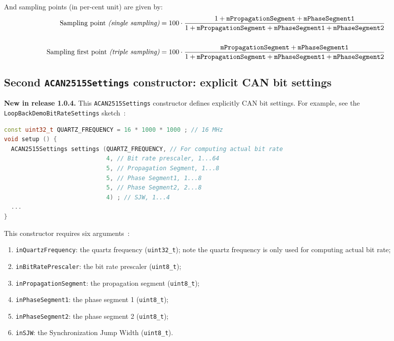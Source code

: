\documentclass[9pt, a4paper, obeyspaces]{extarticle}
\newcommand \subsectionLabel[2]{\subsection{#1}\label{subsec:#2}}
\begin{document}
And sampling points (in per-cent unit) are given by:
{\small
\begin{align*}
\text{Sampling point {\it(single sampling)}} & = 100 \cdot \frac{1 + \texttt{mPropagationSegment} + \texttt{mPhaseSegment1}}{1 + \texttt{mPropagationSegment} + \texttt{mPhaseSegment1} + \texttt{mPhaseSegment2}}  \\
  & \\
\text{Sampling first point {\it(triple sampling)}} & = 100 \cdot \frac{\texttt{mPropagationSegment} + \texttt{mPhaseSegment1}}{1 + \texttt{mPropagationSegment} + \texttt{mPhaseSegment1} + \texttt{mPhaseSegment2}}
\end{align*}
}




\subsectionLabel{Second \texttt{ACAN2515Settings} constructor: explicit CAN bit settings}{explicitCANbitSettings}

{\bf New in release 1.0.4.} This \texttt{ACAN2515Settings} constructor defines explicitly CAN bit settings. For example, see the \texttt{LoopBackDemoBitRateSettings} sketch~:
{ \small\begin{lstlisting}[language=c++]
const uint32_t QUARTZ_FREQUENCY = 16 * 1000 * 1000 ; // 16 MHz
void setup () {
  ACAN2515Settings settings (QUARTZ_FREQUENCY, // For computing actual bit rate
                             4, // Bit rate prescaler, 1...64
                             5, // Propagation Segment, 1...8
                             5, // Phase Segment1, 1...8
                             5, // Phase Segment2, 2...8
                             4) ; // SJW, 1...4
  ...
}
\end{lstlisting}}

This constructor requires six arguments~:
\begin{enumerate}
  \item \texttt{inQuartzFrequency}: the quartz frequency (\texttt{uint32\_t}); note the quartz frequency is only used for computing actual bit rate;
  \item \texttt{inBitRatePrescaler}: the bit rate prescaler (\texttt{uint8\_t});
  \item \texttt{inPropagationSegment}: the propagation segment (\texttt{uint8\_t});
  \item \texttt{inPhaseSegment1}: the phase segment 1 (\texttt{uint8\_t});
  \item \texttt{inPhaseSegment2}: the phase segment 2 (\texttt{uint8\_t});
  \item \texttt{inSJW}: the Synchronization Jump Width (\texttt{uint8\_t}).
\end{enumerate}
\end{document}
